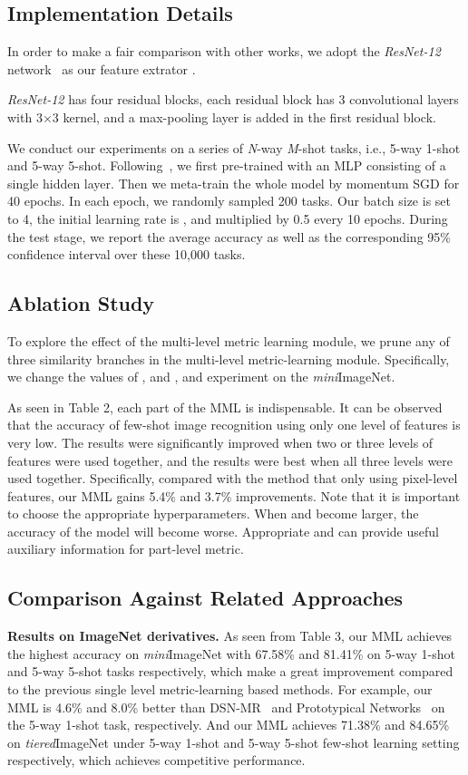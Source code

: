 \documentclass{article}
\begin{document}
\subsection{Implementation Details}
In order to make a fair comparison with other works, we adopt the \emph{ResNet-12} network~\cite{cvprLeeMRS19} as our feature extrator . 

\emph{ResNet-12} has four residual blocks, each residual block has 3 convolutional layers with 3×3 kernel, and a  max-pooling layer is added in the first residual block.

We conduct our experiments on a series of \emph{N}-way \emph{M}-shot tasks, i.e., 5-way 1-shot and 5-way 5-shot.
Following~\cite{feat}, we first pre-trained  with an MLP consisting of a single hidden layer. Then we meta-train the whole model by momentum SGD for 40 epochs.
In each epoch, we randomly sampled 200 tasks. Our batch size is set to 4, the initial learning rate is , and multiplied by 0.5 every 10 epochs. During the test stage, we report the average accuracy as well as the corresponding 95\% confidence interval over these 10,000 tasks.

\subsection{Ablation Study}
To explore the effect of the multi-level metric learning module, we prune any of three similarity branches in the multi-level metric-learning module. Specifically, we change the values of ,  and , and experiment on the \emph{mini}ImageNet. 

As seen in Table 2, each part of the MML is indispensable. It can be observed that the accuracy of few-shot image recognition using only one level of features is very low. The results were significantly improved when two or three levels of features were used together, and the results were best when all three levels were used together. Specifically, compared with the method that only using pixel-level features, our MML gains 5.4\% and 3.7\% improvements.
Note that it is important to choose the appropriate hyperparameters. When  and  become larger, the accuracy of the model will become worse. Appropriate  and  can provide useful auxiliary information for part-level metric.


\subsection{Comparison Against Related Approaches}
\textbf{Results on ImageNet derivatives.} 
As seen from Table 3, our MML achieves the highest accuracy on \emph{mini}ImageNet with 67.58\% and 81.41\% on 5-way 1-shot and 5-way 5-shot tasks respectively, which make a great improvement compared to the previous single level metric-learning based methods. For example, our MML is 4.6\% and 8.0\% better than DSN-MR~\cite{simon2020adaptive} and Prototypical Networks~\cite{snell2017prototypical} on the 5-way 1-shot task, respectively. And our MML achieves 71.38\% and 84.65\% on \emph{tiered}ImageNet under 5-way 1-shot and 5-way 5-shot few-shot learning setting respectively, which achieves competitive performance.
\end{document}
